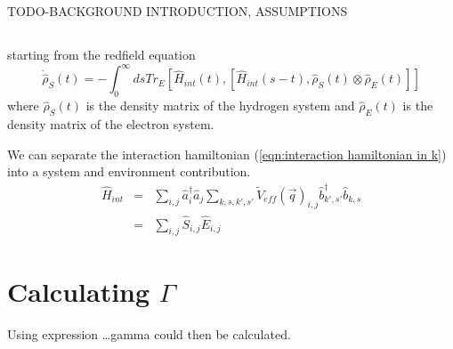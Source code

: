 
\subsection{}
TODO-BACKGROUND INTRODUCTION, ASSUMPTIONS

\subsection{}
starting from the redfield equation
\begin{equation}
    \dot{\hat{\rho}}_S(t) =
    - \int_0^{\infty} ds
    Tr_{E}[\hat{H}_{int}(t),
            [\hat{H}_{int}(s-t),
                    \hat{\rho}_S(t) \otimes \hat{\rho}_E(t)]]
\end{equation}
where \(\hat{\rho}_S(t)\) is the
density matrix of the hydrogen system
and \(\hat{\rho}_E(t)\) is the density
matrix of the electron system.

We can separate the interaction
hamiltonian (\cref{eqn:interaction hamiltonian in k})
into a system and environment contribution.
\begin{eqnarray}
    \hat{H}_{int} &=& \sum_{i,j} \hat{a}^\dagger_{i}\hat{a}_{j}
    \sum_{k,s,k',s'} {\tilde{V}_{eff}(\vec{q})}_{i,j}
    \hat{b}^\dagger_{k',s'}\hat{b}_{k,s}\\
    &=& \sum_{i,j} \hat{S}_{i,j} \hat{E}_{i,j}
\end{eqnarray}

\section{Calculating \(\Gamma \)}
Using expression \ldots gamma could then
be calculated.